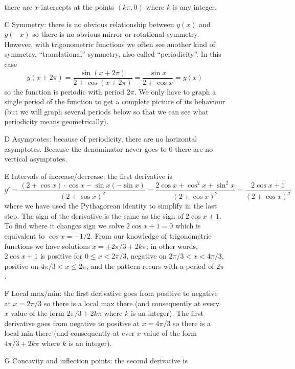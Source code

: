 \documentclass{article}
\begin{document}
\begin{enumerate}
\begin{enumerate}
\begin{itemize}
      there are $x$-intercepts at the points $(k\pi,0)$ where $k$ is
      any integer.
    \item[C] Symmetry: there is no obvious relationship between $y(x)$
      and $y(-x)$ so there is no obvious mirror or rotational
      symmetry.  However, with trigonometric functions we often see
      another kind of symmetry, ``translational'' symmetry, also
      called ``periodicity''.  In this case
      \begin{displaymath}
        y(x+2\pi)=\frac{\sin(x+2\pi)}{2+\cos(x+2\pi)}
        = \frac{\sin x}{2+\cos x} = y(x)
      \end{displaymath}
      so the function is periodic with period $2\pi$.  We only have to
      graph a single period of the function to get a complete picture
      of its behaviour (but we will graph several periods below so
      that we can see what periodicity means geometrically).
    \item[D] Asymptotes: because of periodicity, there are no
      horizontal asymptotes.  Because the denominator never goes to
      $0$ there are no vertical asymptotes.
    \item[E] Intervals of increase/decrease: the first derivative is
      \begin{displaymath}
        y'=\frac{(2+\cos x)\cdot \cos x - \sin x (-\sin x)}{(2+\cos x)^2}
        = \frac{2\cos x +\cos^2 x + \sin^2 x}{(2+\cos x)^2}
        = \frac{2\cos x + 1}{(2+\cos x)^2}
      \end{displaymath}
      where we have used the Pythagorean identity to simplify in the
      last step.  The sign of the derivative is the same as the sign
      of $2\cos x+1$.  To find where it changes sign we solve
      $2\cos x+1=0$ which is equivalent to $\cos x = -1/2$.  From our
      knowledge of trigonometric functions we have solutions
      $x=\pm 2\pi/3+ 2k\pi$; in other words, $2\cos x + 1$ is positive
      for $0\le x < 2\pi/3$, negative on $2\pi/3 < x < 4\pi/3$,
      positive on $4\pi/3<x\le 2\pi$, and the pattern recurs with a
      period of $2\pi$.
    \item[F] Local max/min: the first derivative goes from positive to
      negative at $x=2\pi/3$ so there is a local max there (and
      consequently at every $x$ value of the form $2\pi/3+2k\pi$ where
      $k$ is an integer).  The first derivative goes from negative to
      positive at $x=4\pi/3$ so there is a local min there (and
      consequently at ever $x$ value of the form $4\pi/3+2k\pi$ where
      $k$ is an integer).
    \item[G] Concavity and inflection points: the second derivative is

\end{itemize}
\end{enumerate}
\end{enumerate}
\end{document}
